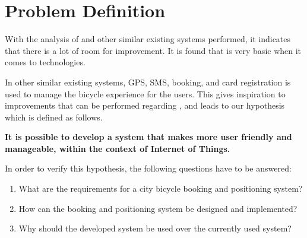 \section{Problem Definition}
With the analysis of \bycykel and other similar existing systems performed, it indicates that there is a lot of room for improvement.
It is found that \bycykel is very basic when it comes to technologies.

In other similar existing systems, GPS, SMS, booking, and card registration is used to manage the bicycle experience for the users.
This gives inspiration to improvements that can be performed regarding \bycykelwithoutspace, and leads to our hypothesis which is defined as follows.

\begin{center}
\textbf{It is possible to develop a system that makes \bycykel more user friendly and manageable, within the context of Internet of Things.}
\end{center}

In order to verify this hypothesis, the following questions have to be answered:

\begin{enumerate}
	\item What are the requirements for a city bicycle booking and positioning system?
	\item How can the booking and positioning system be designed and implemented?
	\item Why should the developed system be used over the currently used system?
\end{enumerate}
